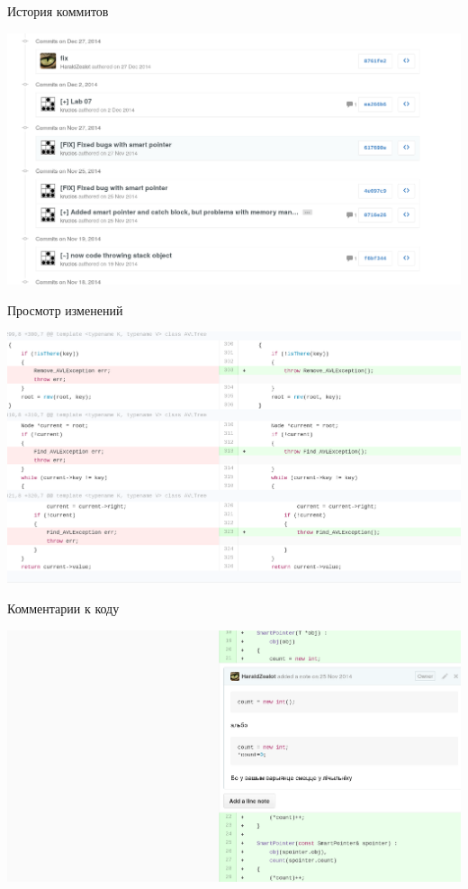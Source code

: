 \documentclass[xetex,14pt,serif,compress,hyperref={xetex}]{beamer}
\begin{document}
\begin{frame}{История коммитов}
\begin{center}
\includegraphics[scale=0.4,keepaspectratio]{snp46.png}
\end{center}
\end{frame}

\begin{frame}{Просмотр изменений}
\begin{center}
\includegraphics[scale=0.4,keepaspectratio]{snp47.png}
\end{center}
\end{frame}

\begin{frame}{Комментарии к коду}
\begin{center}
\includegraphics[scale=0.4,keepaspectratio]{snp48.png}
\end{center}
\end{frame}
\end{document}
